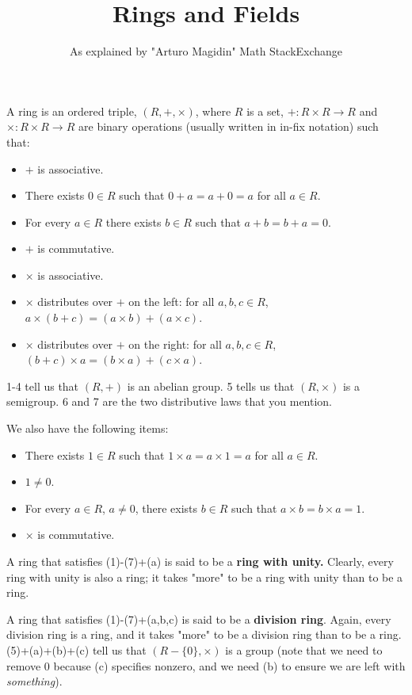 \documentclass[12pt]{article}
\begin{document}
\title{Rings and Fields}
\author{As explained by "Arturo Magidin" Math StackExchange\cite{mathse}}
\maketitle

A ring is an ordered triple, $(R,+,\times)$, where $R$ is a set, $+\colon R\times R\to R$ and $\times\colon R\times R\to R$ are binary operations (usually written in in-fix notation) such that:

\begin{itemize}
 \item $+$ is associative.
 \item There exists $0\in R$ such that $0+a=a+0=a$ for all $a\in R$.
 \item For every $a\in R$ there exists $b\in R$ such that $a+b=b+a=0$.
 \item $+$ is commutative.
 \item $\times$ is associative.
 \item $\times$ distributes over $+$ on the left: for all $a,b,c\in R$, $a\times(b+c) = (a\times b)+(a\times c)$.
 \item $\times$ distributes over $+$ on the right: for all $a,b,c\in R$, $(b+c)\times a = (b\times a)+(c\times a)$.
\end{itemize}

1-4 tell us that $(R,+)$ is an abelian group. 5 tells us that $(R,\times)$ is a semigroup. 6 and 7 are the two distributive laws that you mention.

We also have the following items:

\begin{itemize}
 \item There exists $1\in R$ such that $1\times a = a\times 1 = a$ for all $a\in R$.
 \item $1\neq 0$.
 \item For every $a\in R$, $a\neq 0$, there exists $b\in R$ such that $a\times b = b\times a = 1$.
 \item $\times$ is commutative.
\end{itemize}

A ring that satisfies (1)-(7)+(a) is said to be a \textbf{ring with unity.} Clearly, every ring with unity is also a ring; it takes "more" to be a ring with unity than to be a ring.

A ring that satisfies (1)-(7)+(a,b,c) is said to be a \textbf{division ring}. Again,
every division ring is a ring, and it takes "more" to be a division ring than
to be a ring. (5)+(a)+(b)+(c) tell us that $(R-\{0\},\times)$ is a group (note
that we need to remove $0$ because (c) specifies nonzero, and we need (b) to
ensure we are left with \emph{something}).
\end{document}
